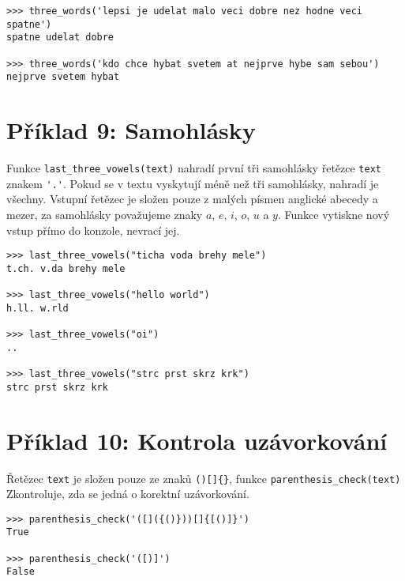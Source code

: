 \documentclass{paper}
\begin{document}
\begin{lstlisting}
>>> three_words('lepsi je udelat malo veci dobre nez hodne veci spatne')
spatne udelat dobre

>>> three_words('kdo chce hybat svetem at nejprve hybe sam sebou')
nejprve svetem hybat

\end{lstlisting}



\section*{Příklad 9: Samohlásky}

\noindent
Funkce \verb!last_three_vowels(text)! nahradí první tři samohlásky řetězce \verb!text! znakem \verb!'.'!. Pokud se v textu vyskytují méně než tři samohlásky, nahradí je všechny. Vstupní řetězec je složen pouze z malých písmen anglické abecedy a mezer, za samohlásky považujeme znaky $a$, $e$, $i$, $o$, $u$ a $y$. Funkce vytiskne nový vstup přímo do konzole, nevrací jej.

\begin{lstlisting}
>>> last_three_vowels("ticha voda brehy mele")
t.ch. v.da brehy mele

>>> last_three_vowels("hello world")
h.ll. w.rld

>>> last_three_vowels("oi")
..

>>> last_three_vowels("strc prst skrz krk")
strc prst skrz krk
\end{lstlisting}


\section*{Příklad 10: Kontrola uzávorkování}

\noindent
Řetězec \verb!text! je složen pouze ze znaků \verb!()[]{}!, funkce \verb!parenthesis_check(text)! Zkontroluje, zda se jedná o korektní uzávorkování.

\begin{lstlisting}
>>> parenthesis_check('([]({()}))[]{[()]}')
True

>>> parenthesis_check('([)]')
False

\end{lstlisting}
\end{document}

